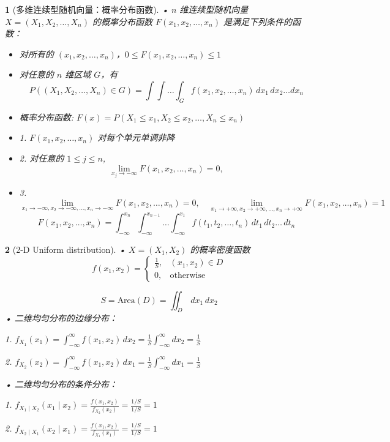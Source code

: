 \documentclass[UTF8]{report}
\theoremstyle{MyLineTheoremStyle} %
\theoremstyle{MyBlockTheoremStyle} %
\theoremstyle{MySubsubsectionStyle} %
\newtheorem{definition}{}
\begin{document}
\begin{definition}[多维连续型随机向量：概率分布函数]
    • \(n\) 维连续型随机向量 \(X = (X_1, X_2, \ldots, X_n)\) 的概率分布函数 \(F(x_1, x_2, \ldots, x_n)\) 是满足下列条件的函数：
    \begin{itemize}
        \item 对所有的 \((x_1, x_2, \ldots, x_n)\)，\(0 \leq F(x_1, x_2, \ldots, x_n) \leq 1\)
        \item 对任意的 \(n\) 维区域 \(G\)，有
        \[
        P((X_1, X_2, \ldots, X_n) \in G) = \int \int \ldots \int_G f(x_1, x_2, \ldots, x_n) \, dx_1 \, dx_2 \ldots dx_n
        \]
    \end{itemize}
    \begin{itemize}
        \item 概率分布函数: \(F(x) = P(X_1 \leq x_1, X_2 \leq x_2, \ldots, X_n \leq x_n)\)
        \item 1. \(F(x_1, x_2, \ldots, x_n)\) 对每个单元单调非降
        \item 2. 对任意的 \(1 \leq j \leq n\),
        \[
        \lim_{x_j \to -\infty} F(x_1, x_2, \ldots, x_n) = 0,
        \]
        \item 3. 
        \[
        \lim_{x_1 \to -\infty, x_2 \to -\infty, \ldots, x_n \to -\infty} F(x_1, x_2, \ldots, x_n) = 0, \quad \lim_{x_1 \to +\infty, x_2 \to +\infty, \ldots, x_n \to +\infty} F(x_1, x_2, \ldots, x_n) = 1
        \]
        \[
        F(x_1, x_2, \ldots, x_n) = \int_{-\infty}^{x_n} \int_{-\infty}^{x_{n-1}} \ldots \int_{-\infty}^{x_1} f(t_1, t_2, \ldots, t_n) \, dt_1 \, dt_2 \ldots \, dt_n
        \]
    \end{itemize} 
\end{definition}

\begin{definition}[2-D Uniform distribution]
    • \(X = (X_1, X_2)\) 的概率密度函数
    \[
    f(x_1, x_2) =
    \begin{cases}
        \frac{1}{S}, & (x_1, x_2) \in D \\
        0, & \text{otherwise}
    \end{cases}
    \]\par
    \[
    S = \text{Area}(D) = \iint_D \, dx_1 \, dx_2 
    \]
    • 二维均匀分布的边缘分布：\par
    1. \(f_{X_1}(x_1) = \int_{-\infty}^{\infty} f(x_1, x_2) \, dx_2 = \frac{1}{S} \int_{-\infty}^{\infty} dx_2 = \frac{1}{S}\)\par
    2. \(f_{X_2}(x_2) = \int_{-\infty}^{\infty} f(x_1, x_2) \, dx_1 = \frac{1}{S} \int_{-\infty}^{\infty} dx_1 = \frac{1}{S}\)\par
    • 二维均匀分布的条件分布：\par
    1. \(f_{X_1 \mid X_2}(x_1 \mid x_2) = \frac{f(x_1, x_2)}{f_{X_2}(x_2)} = \frac{1/S}{1/S} = 1\)\par
    2. \(f_{X_2 \mid X_1}(x_2 \mid x_1) = \frac{f(x_1, x_2)}{f_{X_1}(x_1)} = \frac{1/S}{1/S} = 1\)\par
\end{definition}
\end{document}
